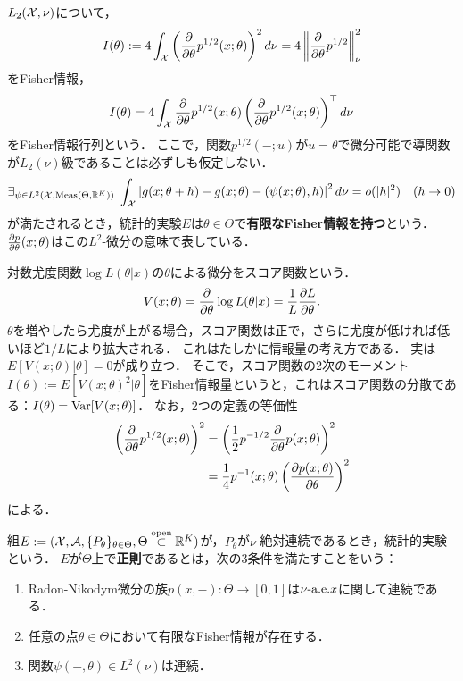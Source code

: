 \documentclass[uplatex,dvipdfmx]{jsreport}
\begin{document}
\begin{definition}
    $L_2(\mathcal{X},\nu)$について，
    \[I(\theta):=4\int_{\mathcal{X}}\left(\frac{\partial }{\partial \theta}p^{1/2}(x;\theta)\right)^2d\nu=4\left\|\frac{\partial }{\partial \theta}p^{1/2}\right\|_\nu^2\]
    をFisher情報，
    \[I(\theta)=4\int_{\mathcal{X}}\frac{\partial }{\partial \theta}p^{1/2}(x;\theta)\left(\frac{\partial }{\partial \theta}p^{1/2}(x;\theta)\right)^\top d\nu\]
    をFisher情報行列という．
    ここで，関数$p^{1/2}(-;u)$が$u=\theta$で微分可能で導関数が$L_2(\nu)$級であることは必ずしも仮定しない．
    \[\exists_{\psi\in L^2(\mathcal{X},\mathrm{Meas}(\Theta,\mathbb{R}^K))}\;\int_{\mathcal{X}}\left|g(x;\theta+h)-g(x;\theta)-(\psi(x;\theta),h)\right|^2d\nu=o(\lvert h\rvert^2)\quad(h\to0)\]
    が満たされるとき，統計的実験$E$は$\theta\in\Theta$で\textbf{有限なFisher情報を持つ}という．
    $\frac{\partial p}{\partial \theta}(x;\theta)$はこの$L^2$-微分の意味で表している．
\end{definition}
\begin{remarks}
    対数尤度関数$\log L(\theta|x)$の$\theta$による微分をスコア関数という．
    \[V(x;\theta)=\frac{\partial }{\partial \theta}\log L(\theta|x)=\frac{1}{L}\frac{\partial L}{\partial \theta}.\]
    $\theta$を増やしたら尤度が上がる場合，スコア関数は正で，さらに尤度が低ければ低いほど$1/L$により拡大される．
    これはたしかに情報量の考え方である．
    実は$E[V(x;\theta)|\theta]=0$が成り立つ．
    そこで，スコア関数の2次のモーメント$I(\theta):=E[V(x;\theta)^2|\theta]$をFisher情報量というと，これはスコア関数の分散である：$I(\theta)=\mathrm{Var}[V(x;\theta)]$．
    なお，2つの定義の等価性
    \begin{align*}
        \left(\frac{\partial }{\partial \theta}p^{1/2}(x;\theta)\right)^{2}&=\left(\frac{1}{2}p^{-1/2}\frac{\partial }{\partial \theta}p(x;\theta)\right)^2\\
        &=\frac{1}{4}p^{-1}(x;\theta)\left(\frac{\partial p(x;\theta)}{\partial \theta}\right)^2
    \end{align*}
    による．
\end{remarks}

\begin{definition}
    組$E:=(\mathcal{X},\mathcal{A},\{P_\theta\}_{\theta\in\Theta},\Theta\overset{\mathrm{open}}{\subset}\mathbb{R}^K)$が，$P_\theta$が$\nu$-絶対連続であるとき，統計的実験という．
    $E$が$\Theta$上で\textbf{正則}であるとは，次の3条件を満たすことをいう：
    \begin{enumerate}
        \item Radon-Nikodym微分の族$p(x,-):\Theta\to[0,1]$は$\nu\text{-a.e.} x$に関して連続である．
        \item 任意の点$\theta\in\Theta$において有限なFisher情報が存在する．
        \item 関数$\psi(-,\theta)\in L^2(\nu)$は連続．
    \end{enumerate}
\end{definition}
\end{document}
